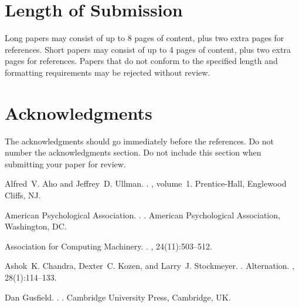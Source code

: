 \documentclass[11pt]{article}
\begin{document}
\section{Length of Submission}
\label{sec:length}

Long papers may consist of up to 8 pages of content, plus two extra
pages for references. Short papers may consist of up to 4 pages of
content, plus two extra pages for references.  Papers that do not
conform to the specified length and formatting requirements may be
rejected without review.



\section*{Acknowledgments}

The acknowledgments should go immediately before the references.  Do
not number the acknowledgments section. Do not include this section
when submitting your paper for review.

%
%

\begin{thebibliography}{}

Alfred~V. Aho and Jeffrey~D. Ullman.
.
, volume~1.
\newblock Prentice-{Hall}, Englewood Cliffs, NJ.

{American Psychological Association}.
.
.
\newblock American Psychological Association, Washington, DC.

{Association for Computing Machinery}.
.
, 24(11):503--512.

Ashok~K. Chandra, Dexter~C. Kozen, and Larry~J. Stockmeyer.
.
\newblock Alternation.
,
  28(1):114--133.

Dan Gusfield.
.
.
\newblock Cambridge University Press, Cambridge, UK.

\end{thebibliography}
\end{document}
